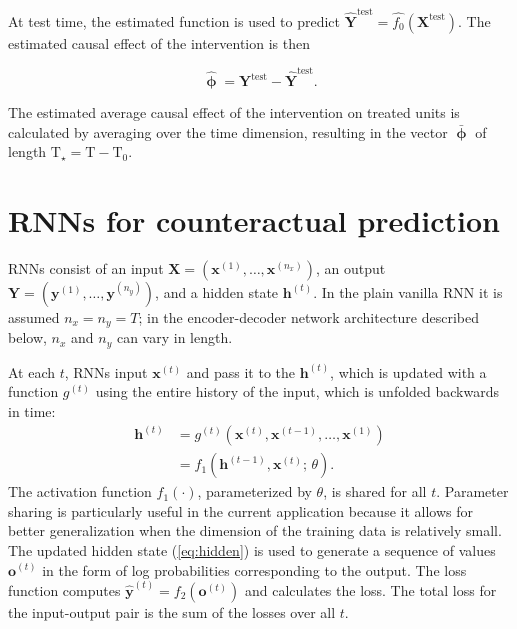 \documentclass[hidelinks,12pt]{article}
\begin{document}
At test time, the estimated function is used to predict $\boldsymbol{\hat{Y}}^{\text{test}} = \hat{f_0} \left(\boldsymbol{X}^{\text{test}}\right)$. The estimated causal effect of the intervention is then

\begin{equation}\label{eq:pointwise}
  \boldsymbol{\hat{\upphi}} = \boldsymbol{Y}^{\text{test}} - \boldsymbol{\hat{Y}}^{\text{test}}. 
\end{equation}

The estimated average causal effect of the intervention on treated units is calculated by averaging over the time dimension, resulting in the vector $\boldsymbol{\bar{\upphi}}$ of length $\text{T}_\star = \text{T}-\text{T}_0$. 

\section{RNNs for counteractual prediction} \label{RNNs-section}

RNNs \citep{graves2012,goodfellow2016deep} consist of an input $\boldsymbol{X} = \left(\boldsymbol{x}^{(1)}, \ldots, \boldsymbol{x}^{(n_x)}\right)$, an output $\boldsymbol{Y} = \left(\boldsymbol{y}^{(1)}, \ldots, \boldsymbol{y}^{(n_y)}\right)$, and a hidden state $\boldsymbol{h}^{(t)}$. In the plain vanilla RNN it is assumed $n_x = n_y = T$; in the encoder-decoder network architecture described below, $n_x$ and $n_y$ can vary in length. 

At each $t$, RNNs input $\boldsymbol{x}^{(t)}$ and pass it to the $\boldsymbol{h}^{(t)}$, which is updated with a function $g^{(t)}$ using the entire history of the input, which is unfolded backwards in time:
%
\begin{align}
\boldsymbol{h}^{(t)} &= g^{(t)} \left(\boldsymbol{x}^{(t)}, \boldsymbol{x}^{(t-1)}, \ldots, \boldsymbol{x}^{(1)} \right) \nonumber \\ 
&= f_1 \left( \boldsymbol{h}^{(t-1)}, \boldsymbol{x}^{(t)}; \, \theta \right). \label{eq:hidden}
\end{align} 
The activation function $f_1 (\cdot)$, parameterized by $\theta$, is shared for all $t$. Parameter sharing is particularly useful in the current application because it allows for better generalization when the dimension of the training data is relatively small. The updated hidden state (\ref{eq:hidden}) is used to generate a sequence of values $\boldsymbol{o}^{(t)}$ in the form of log probabilities corresponding to the output. The loss function computes $\boldsymbol{\hat{y}}^{(t)} = f_2 \left(\boldsymbol{o}^{(t)}\right)$ and calculates the loss. The total loss for the input-output pair is the sum of the losses over all $t$.
\end{document}
